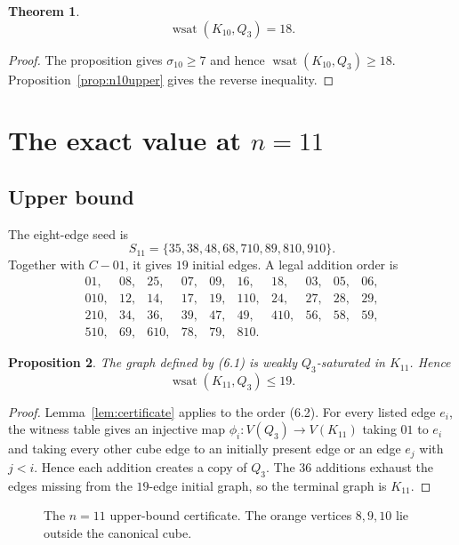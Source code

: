 \documentclass[11pt]{article}
\numberwithin{equation}{section}
\newtheorem{theorem}{Theorem}[section]
\newtheorem{proposition}[theorem]{Proposition}
\newcommand{\wsat}{\operatorname{wsat}}
\begin{document}
\begin{theorem}\label{thm:n10}
\[
\boxed{\wsat(K_{10},Q_3)=18.}
\]
\end{theorem}

\begin{proof}
The proposition gives $\sigma_{10}\ge7$ and hence $\wsat(K_{10},Q_3)\ge18$. Proposition~\ref{prop:n10upper} gives the reverse inequality.
\end{proof}

\section{\texorpdfstring{The exact value at $n=11$}{The exact value at n=11}}\label{sec:n11}

\subsection{Upper bound}
The eight-edge seed is
\[
S_{11}=\{35,38,48,68,7\!10,89,8\!10,9\!10\}.
\tag{6.1}
\]
Together with $C-01$, it gives $19$ initial edges. A legal addition order is
\[
\begin{array}{cccccccccc}
01,&08,&25,&07,&09,&16,&18,&03,&05,&06,\\
0\!10,&12,&14,&17,&19,&1\!10,&24,&27,&28,&29,\\
2\!10,&34,&36,&39,&47,&49,&4\!10,&56,&58,&59,\\
5\!10,&69,&6\!10,&78,&79,&8\!10.
\end{array}
\tag{6.2}
\]

\begin{proposition}\label{prop:n11upper}
The graph defined by (6.1) is weakly $Q_3$-saturated in $K_{11}$. Hence
\[
\wsat(K_{11},Q_3)\le19.
\]
\end{proposition}

\begin{proof}
Lemma~\ref{lem:certificate} applies to the order (6.2). For every listed edge $e_i$, the witness table gives an injective map $\phi_i:V(Q_3)\to V(K_{11})$ taking $01$ to $e_i$ and taking every other cube edge to an initially present edge or an edge $e_j$ with $j<i$. Hence each addition creates a copy of $Q_3$. The $36$ additions exhaust the edges missing from the $19$-edge initial graph, so the terminal graph is $K_{11}$.
\end{proof}

\begin{figure}[t]
\centering
\resizebox{0.72\linewidth}{!}{}
\caption{The $n=11$ upper-bound certificate. The orange vertices $8,9,10$ lie outside the canonical cube.}
\label{fig:n11seed}
\end{figure}
\end{document}
